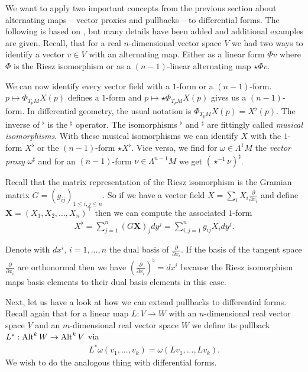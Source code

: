 \documentclass[../main.tex]{subfiles}
\begin{document}
We want to apply two important concepts from the previous section about 
alternating maps -- vector proxies and pullbacks -- to differential forms.
The following is based on \cite[Ch.\,6]{arnold}, 
but many details have been
added and additional examples are given.
Recall, that for a real $n$-dimensional vector space $V$ we had two 
ways to identify a vector $v\in V$ with an alternating map. Either as a 
linear form $\Phi v$ where $\Phi$ is the Riesz isomorphism or as a 
$(n-1)$-linear alternating map $\star \Phi v$. 

We can now identify every vector field with a $1$-form or 
a $(n-1)$-form. $p \mapsto \Phi_{T_p M} X(p)$ defines a $1$-form and  
$p \mapsto \star \Phi_{T_p M} X(p)$ gives us a $(n-1)$-form. In differential 
geometry, the usual notation is
$\Phi_{T_p M} X(p) = X^\flat(p)$. The inverse of $^\flat$ is the $^\sharp$ operator.
The isomorphisms $^\flat$ and $^\sharp$ 
are fittingly called \textit{musical isomorphisms}. 
With these musical isomorphisms we can identify $X$ with the $1$-form 
$X^\flat$ or the $(n-1)$-form $\star X^\flat$. Vice versa, we find 
for $\omega \in \Lambda^1 M$ the \textit{vector proxy} $\omega ^\sharp$ and for 
an $(n-1)$-form $\nu \in \Lambda^{n-1} M$ we get $(\star^{-1} \nu)^\sharp$.

Recall that the matrix representation of the Riesz isomorphism is the 
Gramian matrix $G = (g_{ij})_{1\leq i,j \leq n} $. So if we have a vector field 
$X = \sum_i X_i \frac{\partial}{\partial x_i}$ and define 
$\mathbf{X} = (X_1, X_2, ..., X_n)^\top$ then we can compute the 
associated $1$-form 
\begin{align*}
    X^\flat = \sum_{j=1}^n (G \mathbf{X})_j dy^j 
    = \sum_{i,j=1}^n g_{ij} X_i dy^j.
\end{align*}

Denote with $dx^i$, $i=1, ..., n$ the dual basis of 
$\frac{\partial}{\partial x_i}$.
If the basis of the tangent space $\frac{\partial}{\partial x_i}$ are 
orthonormal then we have $(\frac{\partial}{\partial x_i})^\flat = dx^i$ 
because the Riesz isomorphism maps basis elements to their dual basis elements
in this case.

Next, let us have a look at how we can extend pullbacks to differential forms.
Recall again that for a linear map $L: V \rightarrow W$ with an 
$n$-dimensional real vector space $V$ and an 
$m$-dimensional real vector space $W$ we define its pullback 
$L^*: {\text{Alt}^{k}\,W} \rightarrow {\text{Alt}^{k}\,V}$ via 
\begin{align*}
    L^*\omega (v_1, ..., v_k) = \omega (Lv_1, ..., L v_k).
\end{align*} 
We wish to do the analogous thing with differential forms. 
\end{document}

